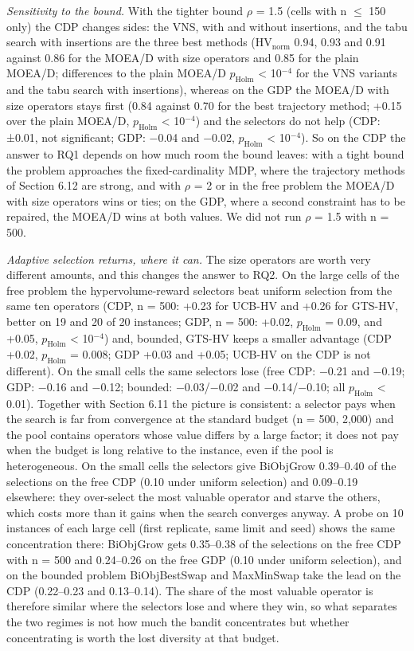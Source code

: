 \emph{Sensitivity to the bound.} With the tighter bound $\rho$ = 1.5 (cells with n $\leq$ 150 only) the CDP changes sides: the VNS, with and without insertions, and the tabu search with insertions are the three best methods ($\mathrm{HV}_{\mathrm{norm}}$ 0.94, 0.93 and 0.91 against 0.86 for the MOEA/D with size operators and 0.85 for the plain MOEA/D; differences to the plain MOEA/D $p_{\mathrm{Holm}}$ < 10$^{-4}$ for the VNS variants and the tabu search with insertions), whereas on the GDP the MOEA/D with size operators stays first (0.84 against 0.70 for the best trajectory method; +0.15 over the plain MOEA/D, $p_{\mathrm{Holm}}$ < 10$^{-4}$) and the selectors do not help (CDP: ±0.01, not significant; GDP: $-$0.04 and $-$0.02, $p_{\mathrm{Holm}}$ < 10$^{-4}$). So on the CDP the answer to RQ1 depends on how much room the bound leaves: with a tight bound the problem approaches the fixed-cardinality MDP, where the trajectory methods of Section 6.12 are strong, and with $\rho$ = 2 or in the free problem the MOEA/D with size operators wins or ties; on the GDP, where a second constraint has to be repaired, the MOEA/D wins at both values. We did not run $\rho$ = 1.5 with n = 500.

\emph{Adaptive selection returns, where it can.} The size operators are worth very different amounts, and this changes the answer to RQ2. On the large cells of the free problem the hypervolume-reward selectors beat uniform selection from the same ten operators (CDP, n = 500: +0.23 for UCB-HV and +0.26 for GTS-HV, better on 19 and 20 of 20 instances; GDP, n = 500: +0.02, $p_{\mathrm{Holm}}$ = 0.09, and +0.05, $p_{\mathrm{Holm}}$ < 10$^{-4}$) and, bounded, GTS-HV keeps a smaller advantage (CDP +0.02, $p_{\mathrm{Holm}}$ = 0.008; GDP +0.03 and +0.05; UCB-HV on the CDP is not different). On the small cells the same selectors lose (free CDP: $-$0.21 and $-$0.19; GDP: $-$0.16 and $-$0.12; bounded: $-$0.03/$-$0.02 and $-$0.14/$-$0.10; all $p_{\mathrm{Holm}}$ < 0.01). Together with Section 6.11 the picture is consistent: a selector pays when the search is far from convergence at the standard budget (n = 500, 2,000) and the pool contains operators whose value differs by a large factor; it does not pay when the budget is long relative to the instance, even if the pool is heterogeneous. On the small cells the selectors give BiObjGrow 0.39--0.40 of the selections on the free CDP (0.10 under uniform selection) and 0.09--0.19 elsewhere: they over-select the most valuable operator and starve the others, which costs more than it gains when the search converges anyway. A probe on 10 instances of each large cell (first replicate, same limit and seed) shows the same concentration there: BiObjGrow gets 0.35--0.38 of the selections on the free CDP with n = 500 and 0.24--0.26 on the free GDP (0.10 under uniform selection), and on the bounded problem BiObjBestSwap and MaxMinSwap take the lead on the CDP (0.22--0.23 and 0.13--0.14). The share of the most valuable operator is therefore similar where the selectors lose and where they win, so what separates the two regimes is not how much the bandit concentrates but whether concentrating is worth the lost diversity at that budget.

